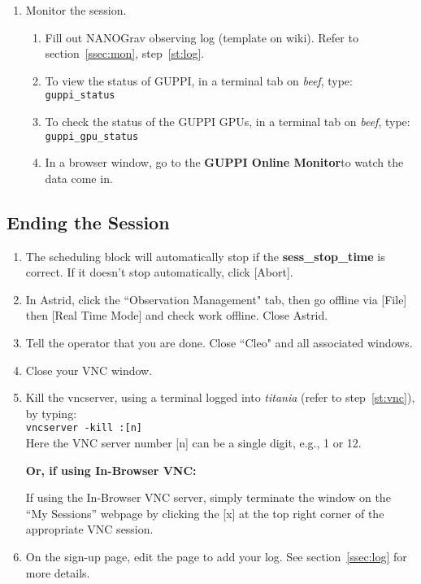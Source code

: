 \documentclass[11pt, reqno, tbtags]{article}
\begin{document}
\begin{enumerate}
 \item Monitor the session. \begin{enumerate} %
  \item Fill out NANOGrav observing log (template on wiki\footnotemark[1]). Refer to section~\ref{ssec:mon}, step~\ref{st:log}. %

  \item To view the status of GUPPI, in a terminal tab on \textit{beef}, type: \\ %
  \texttt{guppi\_status}

  \item To check the status of the GUPPI GPUs, in a terminal tab on \textit{beef}, type: \\ %
  \texttt{guppi\_gpu\_status}

  \item In a browser window, go to the \textbf{GUPPI Online Monitor}\footnotemark[5] to watch the data come in.  %
 \end{enumerate}
\end{enumerate}

\subsection{Ending the Session}\label{ssec:qc} %
\begin{enumerate}
 \item The scheduling block will automatically stop if the \textbf{sess\_stop\_time} is correct.  If it doesn't stop automatically, click [Abort].  

 \item In Astrid, click the ``Observation Management" tab, then go offline via [File] then [Real Time Mode] and check work offline.  Close Astrid.  

 \item Tell the operator that you are done.  Close ``Cleo" and all associated windows.  

 \item Close your VNC window. 

 \item Kill the vncserver, using a terminal logged into \textit{titania} (refer to step~\ref{st:vnc}), by typing: \\                   
 \texttt{vncserver -kill :[n]} \\
 Here the VNC server number [n] can be a single digit, e.g., 1 or 12.
 \begin{center} {\bf{Or, if using In-Browser VNC:}} \end{center} 
If using the In-Browser VNC server, simply terminate the window on the ``My Sessions'' webpage by clicking the [x] at the top right corner of the appropriate VNC session.


 \item On the sign-up page\footnotemark[1], edit the page to add your log.  See section~\ref{ssec:log} for more details. 

\end{enumerate}
\end{document}
